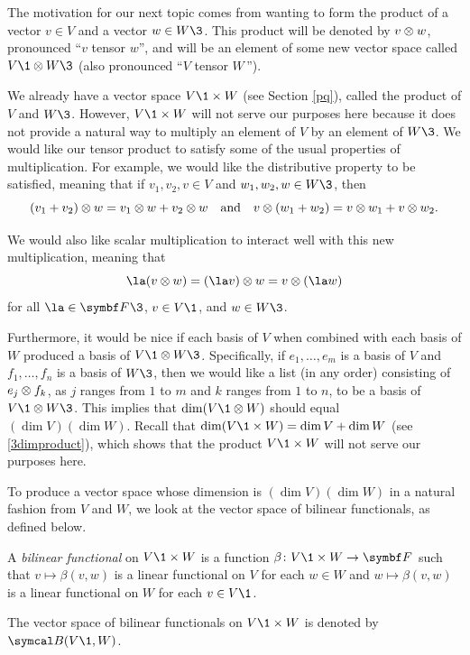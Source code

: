 The motivation for our next topic comes from wanting to form the product of a vector $v \in V$ and a vector $w \in W\3$. This product will be denoted by $v \otimes w$, pronounced ``$v$ tensor $w$''\!, and will be an element of some new vector space called
$V\1 \tensor W\3$ (also pronounced ``$V$ tensor $W\,$'').

We already have a vector space $V\1 \times W$ (see Section \ref{pq}), called the product of $V$ and $W\3$. However, $V\1 \times W$ will not serve our purposes here because it does not provide a natural way to multiply an element of $V$ by an element of $W\3$. We would like our tensor product to satisfy some of the usual properties of multiplication. For example, we would like the distributive property to be satisfied, meaning that if $v_1, v_2, v \in V$ and $w_1, w_2, w \in W\3$, then
\[
(v_1 + v_2) \otimes w = v_1 \otimes w + v_2 \otimes w \quad \text{and} \quad v \otimes (w_1 + w_2) = v \otimes w_1 + v \otimes w_2.
\]


We would also like scalar multiplication to interact well with this new multiplication, meaning that
\[
\la (v \tensor w) = (\la v) \tensor w = v \tensor (\la w)
\]
for all $\la \in \F{}\3$, $v \in V\1$, and $w \in W\3$.

Furthermore, it would be nice if each basis of $V$ when combined with each basis of $W$ produced a basis of $V\1 \tensor W\3$. Specifically, if $e_1, \ldots, e_m$ is a basis of $V$ and $f_1, \ldots, f_n$ is a basis of $W\3$, then we would like a list (in any order) consisting of $e_j \otimes f_k$, as $j$ ranges from $1$ to $m$ and $k$ ranges from $1$ to $n$, to be a basis of
$V\1 \tensor W\3$. This implies that $\dim (V\1 \tensor W)$ should equal $(\dim V)(\dim W)$. Recall that
$\dim(V\1 \times W) = \dim V + \dim W$ (see \ref{3dimproduct}), which shows that the product $V\1 \times W$ will not serve our purposes here.

To produce a vector space whose dimension is $(\dim V)(\dim W)$ in a natural fashion from $V$ and $W$, we look at the vector space of bilinear functionals, as defined below.

{\begin{Itemize}
\item
A \emph{bilinear functional} on $V\1 \times W$ is a function $\fun \beta {V\1 \times W} {\F{}}$ such that $v \mapsto \beta(v, w)$
is a linear functional on $V$ for each $w\in W$ and
$w \mapsto \beta(v, w)$ is a linear functional on $W$ for each $v \in V\1$.
\item
The vector space of bilinear functionals on $V\1 \times W$ is denoted by $\B(V\1,W)$.
\end{Itemize}}

